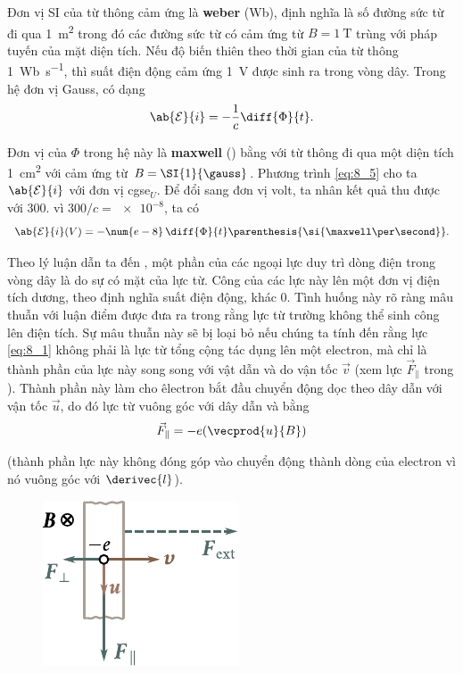 Đơn vị SI của từ thông cảm ứng là \textbf{weber} (\si{\weber}), định nghĩa là số đường sức từ đi qua \SI{1}{\metre\squared} trong đó các đường sức từ có cảm ứng từ $B = \SI{1}{\tesla}$ trùng với pháp tuyến của mặt diện tích.
Nếu độ biến thiên theo thời gian của từ thông \SI{1}{\weber\per\second}, thì suất điện động cảm ứng \SI{1}{\volt} được sinh ra trong vòng dây.
Trong hệ đơn vị Gauss,  có dạng
\begin{equation}\label{eq:8_5}
    \ab{\mathcal{E}}{i} = - \frac{1}{c} \diff{\Phi}{t}.
\end{equation}

\noindent
Đơn vị của $\Phi$ trong hệ này là \textbf{maxwell} (\si{\maxwell}) bằng với từ thông đi qua một diện tích \SI{1}{\centi\metre\squared} với cảm ứng từ $B = \SI{1}{\gauss}$.
Phương trình \eqref{eq:8_5} cho ta $\ab{\mathcal{E}}{i}$
với đơn vị cgse$_U$.
Để đổi sang đơn vị volt, ta nhân kết quả thu được với $300$. vì $300/c = \num{e-8}$, ta có
\begin{equation}\label{eq:8_6}
    \ab{\mathcal{E}}{i}(V) = -\num{e-8}\, \diff{\Phi}{t} \parenthesis{\si{\maxwell\per\second}}.
\end{equation}

Theo lý luận dẫn ta đến , một phần của các ngoại lực duy trì dòng điện trong vòng dây là do sự có mặt của lực từ.
Công của các lực này lên một đơn vị điện tích dương, theo định nghĩa suất điện động, khác 0.
Tình huống này rõ ràng mâu thuẫn với luận điểm được đưa ra trong  rằng lực từ trường không thể sinh công lên điện tích.
Sự mâu thuẫn này sẽ bị loại bỏ nếu chúng ta tính đến rằng lực \eqref{eq:8_1} không phải là lực từ tổng cộng tác dụng lên một electron, mà chỉ là thành phần của lực này song song với vật dẫn và do vận tốc $\vec{v}$ (xem lực $\vec{F}_{\parallel}$ trong ).
Thành phần này làm cho êlectron bắt đầu chuyển động dọc theo dây dẫn với vận tốc $\vec{u}$, do đó lực từ vuông góc với dây dẫn và bằng
\begin{equation*}
    \vec{F}_{\parallel} = - e (\vecprod{u}{B})
\end{equation*}

\noindent
(thành phần lực này không đóng góp vào chuyển động thành dòng của electron vì nó vuông góc với $\derivec{l}$).

\begin{figure}[!h]
	\begin{center}
		\includegraphics[scale=1]{figures/ch_08/fig_8_3.pdf}
		\caption[]{}
		\label{fig:8_3}
	\end{center}
	\vspace{-0.8cm}
\end{figure}

